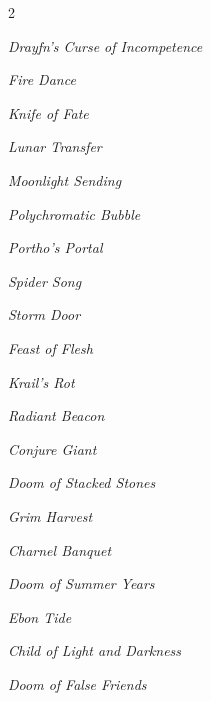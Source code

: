\documentclass[10pt,a4paper,twoside,bg=print,twocolumn,openany,nodeprecatedcode]{dndbook}
\begin{document}
\begin{description}
\begin{multicols}{2}
{\par \vspace { 9pt plus 3pt minus 3pt } \noindent  {} \nopagebreak }

\begin{description}
\item \textit{Drayfn's Curse of Incompetence}
\item \textit{Fire Dance}
\item \textit{Knife of Fate}
\item \textit{Lunar Transfer}
\item \textit{Moonlight Sending}
\item \textit{Polychromatic Bubble}
\item \textit{Portho's Portal}
\item \textit{Spider Song}
\item \textit{Storm Door}
\end{description}

{\par \vspace { 9pt plus 3pt minus 3pt } \noindent  {} \nopagebreak }

\begin{description}
\item \textit{Feast of Flesh}
\item \textit{Krail's Rot}
\item \textit{Radiant Beacon}
\end{description}

{\par \vspace { 9pt plus 3pt minus 3pt } \noindent  {} \nopagebreak }

\begin{description}
\item \textit{Conjure Giant}
\item \textit{Doom of Stacked Stones}
\item \textit{Grim Harvest}
\end{description}

{\par \vspace { 9pt plus 3pt minus 3pt } \noindent  {} \nopagebreak }

\begin{description}
\item \textit{Charnel Banquet}
\item \textit{Doom of Summer Years}
\item \textit{Ebon Tide}
\end{description}

{\par \vspace { 9pt plus 3pt minus 3pt } \noindent  {} \nopagebreak }

\begin{description}
\item \textit{Child of Light and Darkness}
\item \textit{Doom of False Friends}
\end{description}

\end{multicols}

\end{description}
\end{document}
